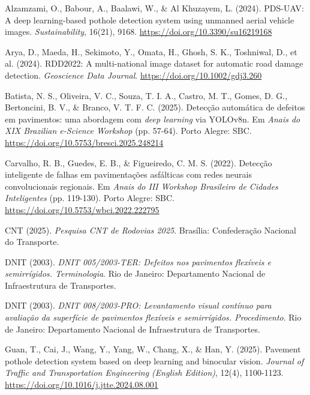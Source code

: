 \documentclass[12pt]{article}
\newenvironment{referencias}{%
  \begin{list}{}{%
    \setlength{\leftmargin}{1.25cm}%
    \setlength{\itemindent}{-1.25cm}%
    \setlength{\labelwidth}{0pt}%
    \setlength{\labelsep}{0pt}%
    \setlength{\itemsep}{6pt}%
    \setlength{\parsep}{0pt}%
    \setlength{\topsep}{6pt}}}%
  {\end{list}}
\begin{document}
\begin{referencias}

\item Alzamzami, O., Babour, A., Baalawi, W., \& Al Khuzayem, L. (2024).
PDS-UAV: A deep learning-based pothole detection system using unmanned
aerial vehicle images. \emph{Sustainability}, 16(21), 9168.
\url{https://doi.org/10.3390/su16219168}

\item Arya, D., Maeda, H., Sekimoto, Y., Omata, H., Ghosh, S. K.,
Toshniwal, D., et al. (2024). RDD2022: A multi-national image dataset for
automatic road damage detection. \emph{Geoscience Data Journal}.
\url{https://doi.org/10.1002/gdj3.260}

\item Batista, N. S., Oliveira, V. C., Souza, T. I. A., Castro, M. T.,
Gomes, D. G., Bertoncini, B. V., \& Branco, V. T. F. C. (2025). Detecção
automática de defeitos em pavimentos: uma abordagem com \emph{deep
learning} via YOLOv8n. Em \emph{Anais do XIX Brazilian e-Science
Workshop} (pp. 57-64). Porto Alegre: SBC.
\url{https://doi.org/10.5753/bresci.2025.248214}

\item Carvalho, R. B., Guedes, E. B., \& Figueiredo, C. M. S. (2022).
Detecção inteligente de falhas em pavimentações asfálticas com redes
neurais convolucionais regionais. Em \emph{Anais do III Workshop
Brasileiro de Cidades Inteligentes} (pp. 119-130). Porto Alegre: SBC.
\url{https://doi.org/10.5753/wbci.2022.222795}

\item CNT (2025). \emph{Pesquisa CNT de Rodovias 2025}. Brasília:
Confederação Nacional do Transporte.

\item DNIT (2003). \emph{DNIT 005/2003-TER: Defeitos nos pavimentos
flexíveis e semirrígidos. Terminologia}. Rio de Janeiro: Departamento
Nacional de Infraestrutura de Transportes.

\item DNIT (2003). \emph{DNIT 008/2003-PRO: Levantamento visual contínuo
para avaliação da superfície de pavimentos flexíveis e semirrígidos.
Procedimento}. Rio de Janeiro: Departamento Nacional de Infraestrutura de
Transportes.

\item Guan, T., Cai, J., Wang, Y., Yang, W., Chang, X., \& Han, Y.
(2025). Pavement pothole detection system based on deep learning and
binocular vision. \emph{Journal of Traffic and Transportation Engineering
(English Edition)}, 12(4), 1100-1123.
\url{https://doi.org/10.1016/j.jtte.2024.08.001}


\end{referencias}
\end{document}
